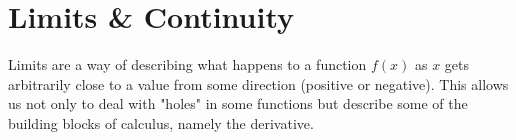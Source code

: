 \chapter{Limits \& Continuity}
\noindent
Limits are a way of describing what happens to a function $f(x)$ as $x$ gets arbitrarily close to a value from some direction (positive or negative).
This allows us not only to deal with "holes" in some functions but describe some of the building blocks of calculus, namely the derivative.









